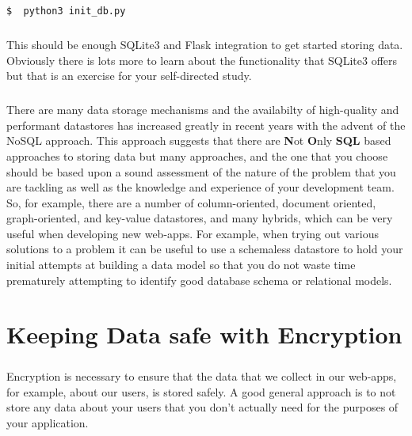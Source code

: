 \documentclass[12pt, a4paper, oneside]{book}
\begin{document}
{\begin{lstlisting}[style=DOS]
$  python3 init_db.py
\end{lstlisting}

\paragraph{} This should be enough SQLite3 and Flask integration to get started storing data. Obviously there is lots more to learn about the functionality that SQLite3 offers but that is an exercise for your self-directed study.

\paragraph{} There are many data storage mechanisms and the availabilty of high-quality and performant datastores has increased greatly in recent years with the advent of the NoSQL approach. This approach suggests that there are {\bf{N}}ot {\bf{O}}nly {\bf{SQL}} based approaches to storing data but many approaches, and the one that you choose should be based upon a sound assessment of the nature of the problem that you are tackling as well as the knowledge and experience of your development team. So, for example, there are a number of column-oriented, document oriented, graph-oriented, and key-value datastores, and many hybrids, which can be very useful when developing new web-apps. For example, when trying out various solutions to a problem it can be useful to use a schemaless datastore to hold your initial attempts at building a data model so that you do not waste time prematurely attempting to identify good database schema or relational models. 


\chapter{Keeping Data safe with Encryption}
\label{lab09}
\paragraph{} Encryption is necessary to ensure that the data that we collect in our web-apps, for example, about our users, is stored safely. A good general approach is to not store any data about your users that you don't actually need for the purposes of your application.


}
\end{document}
